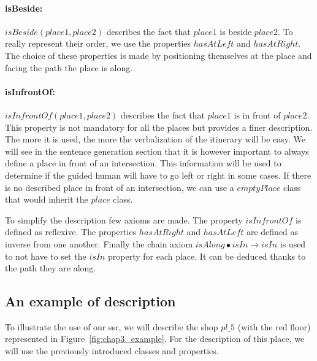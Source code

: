 \paragraph{isBeside:} $isBeside(place1,place2)$ describes the fact that $place1$ is beside $place2$. To really represent their order, we use the properties $hasAtLeft$ and $hasAtRight$. The choice of these properties is made by positioning themselves at the place and facing the path the place is along.

\paragraph{isInfrontOf:} $isInfrontOf(place1,place2)$ describes the fact that $place1$ is in front of $place2$. This property is not mandatory for all the places but provides a finer description. The more it is used, the more the verbalization of the itinerary will be easy. We will see in the sentence generation section that it is however important to always define a place in front of an intersection. This information will be used to determine if the guided human will have to go left or right in some cases. If there is no described place in front of an intersection, we can use a $emptyPlace$ class that would inherit the $place$ class.

To simplify the description few axioms are made. The property $isInfrontOf$ is defined as reflexive. The properties $hasAtRight$ and $hasAtLeft$ are defined as inverse from one another. Finally the chain axiom $isAlong \bullet isIn \rightarrow isIn$ is used to not have to set the $isIn$ property for each place. It can be deduced thanks to the path they are along.

\subsection{An example of description}

To illustrate the use of our \acrshort{ssr}, we will describe the shop $pl\_5$ (with the red floor) represented in Figure~\ref{fig:chap3_example}. For the description of this place, we will use the previously introduced classes and properties.

